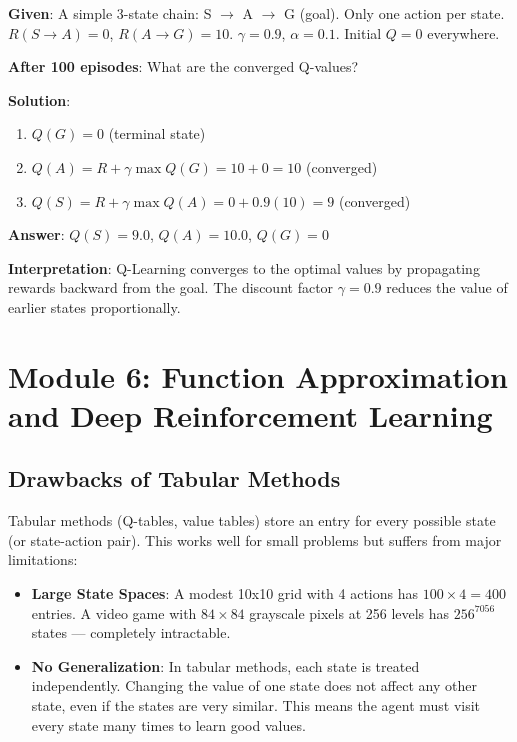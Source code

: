 \documentclass[11pt,a4paper]{article}
\begin{document}
\begin{tcolorbox}[colback=green!5!white,colframe=green!75!black,title=\textbf{Worked Example 39: Q-Learning Convergence}]
\textbf{Given}: A simple 3-state chain: S $\to$ A $\to$ G (goal). Only one action per state. $R(S \to A) = 0$, $R(A \to G) = 10$. $\gamma = 0.9$, $\alpha = 0.1$. Initial $Q = 0$ everywhere.

\textbf{After 100 episodes}: What are the converged Q-values?

\textbf{Solution}:
\begin{enumerate}
    \item $Q(G) = 0$ (terminal state)
    \item $Q(A) = R + \gamma \max Q(G) = 10 + 0 = 10$ (converged)
    \item $Q(S) = R + \gamma \max Q(A) = 0 + 0.9(10) = 9$ (converged)
\end{enumerate}

\textbf{Answer}: $Q(S) = 9.0$, $Q(A) = 10.0$, $Q(G) = 0$

\textbf{Interpretation}: Q-Learning converges to the optimal values by propagating rewards backward from the goal. The discount factor $\gamma = 0.9$ reduces the value of earlier states proportionally.
\end{tcolorbox}


\section{Module 6: Function Approximation and Deep Reinforcement Learning}

\subsection{Drawbacks of Tabular Methods}

Tabular methods (Q-tables, value tables) store an entry for every possible state (or state-action pair). This works well for small problems but suffers from major limitations:

\begin{itemize}
    \item \textbf{Large State Spaces}: A modest 10x10 grid with 4 actions has $100 \times 4 = 400$ entries. A video game with $84 \times 84$ grayscale pixels at 256 levels has $256^{7056}$ states --- completely intractable.
    \item \textbf{No Generalization}: In tabular methods, each state is treated independently. Changing the value of one state does not affect any other state, even if the states are very similar. This means the agent must visit every state many times to learn good values.
\end{itemize}
\end{document}
